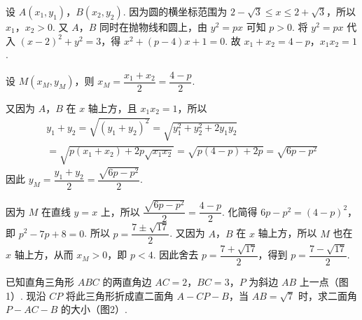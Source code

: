 \begin{solution}
设 \(A(x_1,y_1)\)，\(B(x_2,y_2)\). 因为圆的横坐标范围为 \(2-\sqrt{3}\leqslant x\leqslant2+\sqrt{3}\)，所以 \(x_1\)，\(x_2>0\). 又 \(A\)，\(B\) 同时在抛物线和圆上，由 \(y^2=px\) 可知 \(p>0\). 将 \(y^2=px\) 代入 \((x-2)^2+y^2=3\)，得 \(x^2+\left( p-4 \right)x+1=0\).
故 \(x_1+x_2=4-p\)，\(x_1x_2=1\).

设 \(M(x_M,y_M)\)，则 \(x_M=\dfrac{x_1+x_2}{2}=\dfrac{4-p}{2}\).

又因为 \(A\)，\(B\) 在 \(x\) 轴上方，且 \(x_1x_2=1\)，所以
\[
\begin{gathered}
y_1+y_2
 =\sqrt{\left( y_1+y_2 \right)^2}
 =\sqrt{y_1^2+y_2^2+2y_1y_2}\\
 =\sqrt{p(x_1+x_2)+2p\sqrt{x_1x_2}}
 =\sqrt{p(4-p)+2p}=\sqrt{6p-p^2}
\end{gathered}
\]
因此 \(y_M=\dfrac{y_1+y_2}{2}=\dfrac{\sqrt{6p-p^2}}{2}\).

因为 \(M\) 在直线 \(y=x\) 上，所以 \(\dfrac{\sqrt{6p-p^2}}{2}=\dfrac{4-p}{2}\).
化简得 \(6p-p^2=\left( 4-p \right)^2\)，即 \(p^2-7p+8=0\).
所以 \(p=\dfrac{7\pm \sqrt{17}}{2}\).
又因为 \(A\)，\(B\) 在 \(x\) 轴上方，所以 \(M\) 也在 \(x\) 轴上方，从而 \(x_M>0\)，即 \(p<4\). 因此舍去 \(p=\dfrac{7+\sqrt{17}}{2}\)，得到 \(p=\dfrac{7-\sqrt{17}}{2}\).
\end{solution}

\begin{problem}

已知直角三角形 \(ABC\) 的两直角边 \(AC=2\)，\(BC=3\)，\(P\) 为斜边 \(AB\) 上一点（图1）. 现沿 \(CP\) 将此三角形折成直二面角 \(A-CP-B\)，当 \(AB=\sqrt{7}\) 时，求二面角 \(P-AC-B\) 的大小（图2）.


\end{problem}

